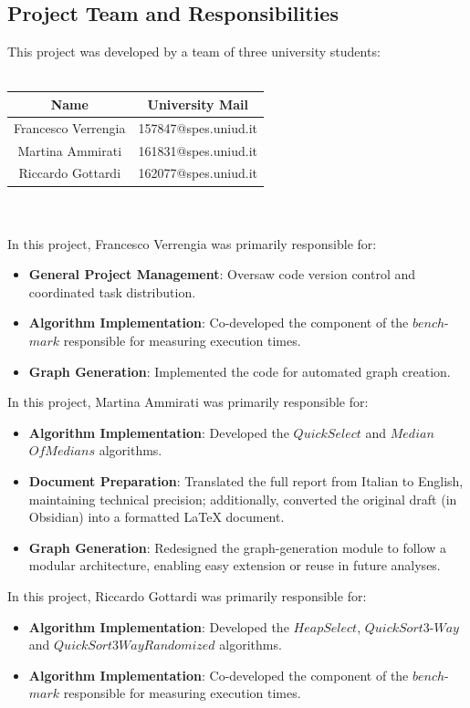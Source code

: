 \documentclass{article}
\begin{document}
\subsection{Project Team and Responsibilities}
This project was developed by a team of three university students: \\ \\
\begin{minipage}{\linewidth} \centering
    \begin{tabular}{|c|c|} 
        \hline \textbf{Name} & \textbf{University Mail} \\ \hline 
        Francesco Verrengia & 157847@spes.uniud.it \\ \hline
        Martina Ammirati & 161831@spes.uniud.it \\ \hline
        Riccardo Gottardi & 162077@spes.uniud.it \\ \hline
    \end{tabular}
\end{minipage} 
\\ \\
In this project, Francesco Verrengia was primarily responsible for:
\begin{itemize}
    \item \textbf{General Project Management}: Oversaw code version control and coordinated task distribution.
    \item \textbf{Algorithm Implementation}: Co-developed the component of the $bench$-$mark$ responsible for measuring execution times.
    \item \textbf{Graph Generation}: Implemented the code for automated graph creation.
\end{itemize}
In this project, Martina Ammirati was primarily responsible for:
\begin{itemize}
    \item \textbf{Algorithm Implementation}: Developed the $QuickSelect$ and $Median$ $OfMedians$ algorithms.
    \item \textbf{Document Preparation}: Translated the full report from Italian to English, maintaining technical precision; additionally, converted the original draft (in Obsidian) into a formatted LaTeX document.
    \item \textbf{Graph Generation}: Redesigned the graph-generation module to follow a modular architecture, enabling easy extension or reuse in future analyses.
    
\end{itemize}
In this project, Riccardo Gottardi was primarily responsible for:
\begin{itemize}
    \item \textbf{Algorithm Implementation}: Developed the $HeapSelect$, $QuickSort3$-$Way$ and $QuickSort3WayRandomized$ algorithms.
    \item \textbf{Algorithm Implementation}: Co-developed the component of the $bench$-$mark$ responsible for measuring execution times.
\end{itemize}
\end{document}

